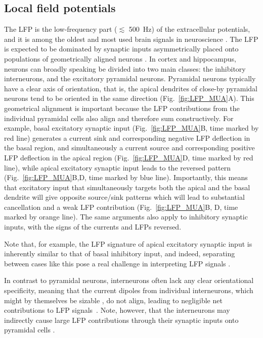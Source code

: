 \documentclass[preprint,11pt,authoryear]{elsarticle}
\newcommand{\hlj}[2][OliveGreen]{ {\sethlcolor{#1} \hl{#2}} }
\newcommand{\hlR}[2][red]{ {\sethlcolor{#1} \hl{#2}} }
\newcommand{\gen}[1]{\color{white}{\hlR{GTE: #1 }}\color{black}}
\newcommand{\gex}[1]{{\color{red}#1}}
\newcommand{\tvnnote}[1]{\color{white}{\hlj{TVN: #1 }}\color{black}}
\begin{document}
\subsection{Local field potentials}
The LFP is the low-frequency part ($\lesssim$ 500~Hz) of the extracellular potentials, and it is among the oldest and most used brain signals in neuroscience \citep{Einevoll2013}. The LFP is expected to be dominated by \gex{synaptic inputs asymmetrically placed onto populations} of geometrically aligned neurons \citep{Nunez2006, Linden2011, Einevoll2013b}.
In cortex and hippocampus, neurons can broadly speaking be divided into two main classes: the inhibitory interneurons, and the excitatory pyramidal neurons. Pyramidal neurons typically have a clear axis of orientation, that is, the apical dendrites of close-by pyramidal neurons tend to be oriented in the same direction (Fig.~\ref{fig:LFP_MUA}A). This geometrical alignment is important because the LFP contributions from the individual pyramidal cells also align and therefore sum constructively.  For example, basal excitatory synaptic input (Fig.~\ref{fig:LFP_MUA}B, time marked by red line) generates a current sink and corresponding negative LFP deflection in the basal region, and simultaneously a current source and corresponding positive LFP deflection in the apical region (Fig.~\ref{fig:LFP_MUA}D, time marked by red line), while apical excitatory synaptic input leads to the reversed pattern (Fig.~\ref{fig:LFP_MUA}B,D, time marked by blue line). 
Importantly, this means that excitatory input that simultaneously targets both the apical and the basal dendrite will give opposite source/sink patterns which will lead to substantial cancellation and a weak LFP contribution (Fig.~\ref{fig:LFP_MUA}B, D, time marked by orange line).
The same arguments also apply to inhibitory synaptic inputs, with the signs of the currents and LFPs reversed. 

Note that, for example, the LFP signature of apical excitatory synaptic input is inherently similar to that of basal inhibitory input, and indeed, separating between cases like this pose a real challenge in interpreting LFP signals \citep{Linden2010}. 

In contrast to pyramidal neurons, interneurons often lack any clear orientational specificity, meaning that the current dipoles from individual interneurons, which might by themselves be sizable \citep{Linden2010}, do not align, leading to negligible net contributions to LFP 
signals~\citep{Mazzoni2015}.
\gex{Note, however, that the interneurons may indirectly cause large LFP contributions through their 
synaptic inputs onto pyramidal cells \citep{Telenczuk2016, Hagen2016}.}
\end{document}
